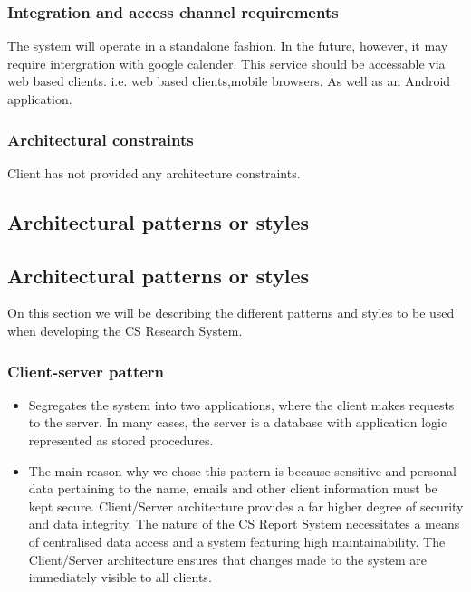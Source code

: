 \documentclass{article}
\begin{document}
			\subsubsection{Integration and access channel requirements}
				The system will operate in a standalone fashion. In the future, however, it may require intergration with google calender.
				This service should be accessable via web based clients. i.e. web based clients,mobile browsers. As well as an Android application.

			\subsubsection{Architectural constraints}
				Client has not provided any architecture constraints.
				

		\subsection{Architectural patterns or styles}
	

		\subsection{Architectural patterns or styles}
		On this section we will be describing the different patterns and styles to be used when developing the CS 		        Research System.
		\setcounter{secnumdepth}{5}
		\subsubsection{Client-server pattern} %
		\begin{itemize}
		 \item Segregates the system into two applications, where the client makes requests to the server. In many 				cases, the server is a database with application logic represented as stored procedures.
		

         \item  The main reason why we chose this pattern is because sensitive and personal data pertaining to the 				name, emails and other client information must be kept secure. Client/Server architecture provides a far 			higher 	degree of security and data integrity. The nature of the CS Report System necessitates a means of 				centralised data access and a system featuring high maintainability. The Client/Server architecture ensures that changes 	made to the system are immediately visible to all clients.
         \end{itemize}
\end{document}

